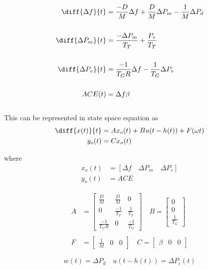 \documentclass[journal]{IEEEtran}
\begin{document}
\begin{align}
  \diff{\Delta f}{t} &= \frac{-D}{M}\Delta f + \frac{D}{M}\Delta P_m - \frac{1}{M}\Delta{P_d} \\ \\
  \diff{\Delta P_m}{t} &= \frac{-\Delta P_m}{T_T} + \frac{P_v}{T_T} \\ \\
  \diff{\Delta P_v}{t} &= \frac{-1}{T_GR}{\Delta f} - \frac{1}{T_G}{\Delta P_v}  \\ \\
  ACE(t) &= \Delta f \beta
\end{align} \\

This can be represented in state space equation as
\begin{align}
  \diff{x(t)}{t} &= Ax_o(t) + Bu(t- h(t)) + F(\omega{t}) \\
  y_o(t) &= Cx_o(t)
\end{align}

where
\begin{align}
  x_o(t) &= [\Delta f \quad  \Delta P_m  \quad \Delta P_v]  \\
  y_o(t) &= ACE
\end{align}

\begin{align}
  A &=
\begin{bmatrix}
  \frac{D}{M} & \frac{D}{M} & 0 \\
  0 & \frac{-1}{T_T} & \frac{1}{T_T} \\
  \frac{-1}{T_GR} & 0 & \frac{-1}{T_G}
\end{bmatrix}
\quad
  B =
\begin{bmatrix}
  0 \\
  0 \\
  \frac{1}{T_G}
\end{bmatrix}
\\ \\
  F &=
\begin{bmatrix}
  \frac{1}{M} & 0 & 0
\end{bmatrix}
\quad
  C = 
\begin{bmatrix}
  \beta & 0 & 0
\end{bmatrix}
\end{align}

\begin{equation}
w(t) = \Delta P_d \quad u(t-h(t)) = \Delta P_c(t)
\end{equation}
\end{document}
